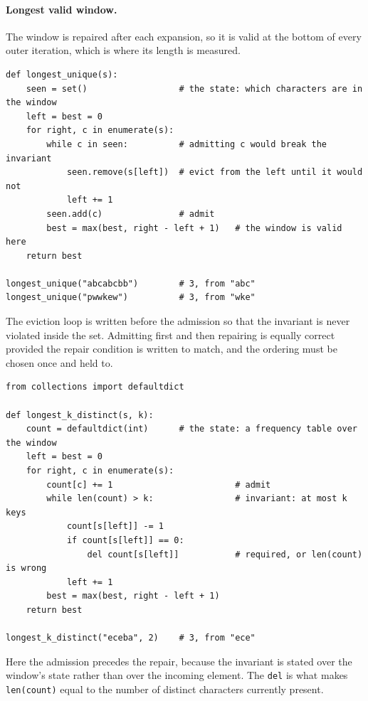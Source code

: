 \medskip

\paragraph{Longest valid window.} The window is repaired after each expansion,
so it is valid at the bottom of every outer iteration, which is where its length
is measured.

\begin{lstlisting}[style=python, caption={Longest substring with no repeated character}]
def longest_unique(s):
    seen = set()                  # the state: which characters are in the window
    left = best = 0
    for right, c in enumerate(s):
        while c in seen:          # admitting c would break the invariant
            seen.remove(s[left])  # evict from the left until it would not
            left += 1
        seen.add(c)               # admit
        best = max(best, right - left + 1)   # the window is valid here
    return best

longest_unique("abcabcbb")        # 3, from "abc"
longest_unique("pwwkew")          # 3, from "wke"
\end{lstlisting}

The eviction loop is written before the admission so that the invariant is never
violated inside the set. Admitting first and then repairing is equally correct
provided the repair condition is written to match, and the ordering must be
chosen once and held to.

\begin{lstlisting}[style=python, caption={Longest substring with at most k distinct characters}]
from collections import defaultdict

def longest_k_distinct(s, k):
    count = defaultdict(int)      # the state: a frequency table over the window
    left = best = 0
    for right, c in enumerate(s):
        count[c] += 1                        # admit
        while len(count) > k:                # invariant: at most k keys
            count[s[left]] -= 1
            if count[s[left]] == 0:
                del count[s[left]]           # required, or len(count) is wrong
            left += 1
        best = max(best, right - left + 1)
    return best

longest_k_distinct("eceba", 2)    # 3, from "ece"
\end{lstlisting}

Here the admission precedes the repair, because the invariant is stated over the
window's state rather than over the incoming element. The \texttt{del} is what
makes \texttt{len(count)} equal to the number of distinct characters currently
present.

